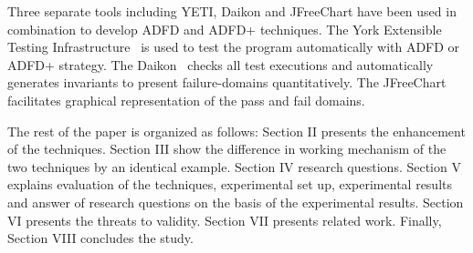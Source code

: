 \documentclass[runningheads,a4paper]{llncs}
\begin{document}
Three separate tools including YETI, Daikon and JFreeChart have been used in combination to develop ADFD and ADFD+ techniques. The York Extensible Testing Infrastructure~\cite{Oriol2011yeti} is used to test the program automatically with ADFD or ADFD+ strategy. The Daikon~\cite{ernst2007daikon} checks all test executions and automatically generates invariants to present failure-domains quantitatively. The JFreeChart~\cite{gilbert2008jfreechart} facilitates graphical representation of the pass and fail domains.




The rest of the paper is organized as follows: Section II presents the enhancement of the techniques. Section III show the difference in working mechanism of the two techniques by an identical example. Section IV research questions. Section V explains evaluation of the techniques, experimental set up, experimental results and answer of research questions on the basis of the experimental results. Section VI presents the threats to validity. Section VII presents related work. Finally, Section VIII concludes the study.


 



\end{document}

